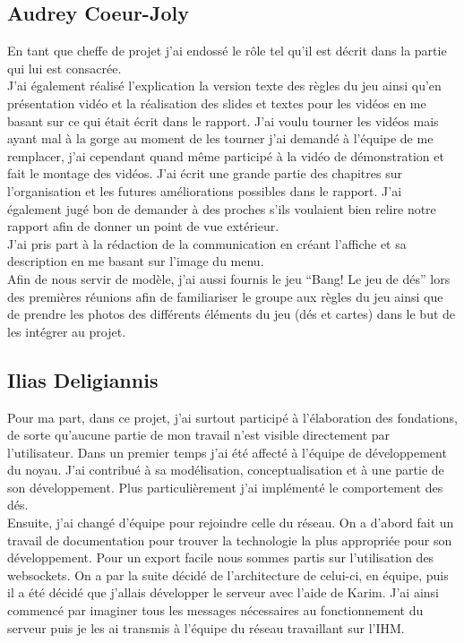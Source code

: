 \documentclass[a4paper,11pt]{article}
\begin{document}
\subsection{Audrey Coeur-Joly}



En tant que cheffe de projet j’ai endossé le rôle tel qu’il est décrit dans la partie qui lui est consacrée.\\ 

	J’ai également réalisé l’explication la version texte des règles du jeu ainsi qu’en présentation vidéo et la réalisation des slides et textes pour les vidéos en me basant sur ce qui était écrit dans le rapport. J’ai voulu tourner les vidéos mais ayant mal à la gorge au moment de les tourner j’ai demandé à l’équipe de me remplacer, j’ai cependant quand même participé à la vidéo de démonstration et fait le montage des vidéos. J’ai écrit une grande partie des chapitres sur l’organisation et les futures améliorations possibles dans le rapport. J’ai également jugé bon de demander à des proches s’ils voulaient bien relire notre rapport afin de donner un point de vue extérieur. \\
	
	J’ai pris part à la rédaction de la communication en créant l’affiche et sa description en me basant sur l’image du menu. \\

	Afin de nous servir de modèle, j’ai aussi fournis le jeu “Bang! Le jeu de dés” lors des premières réunions afin de familiariser le groupe aux règles du jeu ainsi que de prendre les photos des différents éléments du jeu (dés et cartes) dans le but de les intégrer au projet. \\


\subsection{Ilias Deligiannis}

Pour ma part, dans ce projet, j’ai surtout participé à l'élaboration des fondations, de sorte qu'aucune partie de mon travail n’est visible directement par l’utilisateur. Dans un premier temps j’ai été affecté à l’équipe de développement du noyau. J’ai contribué à sa modélisation, conceptualisation et à une partie de son développement. Plus particulièrement j’ai implémenté le comportement des dés.  \\

Ensuite, j’ai changé d’équipe pour rejoindre celle du réseau. On a d’abord fait un travail de documentation pour trouver la technologie la plus appropriée pour son développement. Pour un export facile nous sommes partis sur l’utilisation des websockets. On a par la suite décidé de l'architecture de celui-ci, en équipe, puis il a été décidé que j’allais développer le serveur avec l’aide de Karim. J’ai ainsi commencé par imaginer tous les messages nécessaires au fonctionnement du serveur puis je les ai transmis à l’équipe du réseau travaillant sur l’IHM. \\
\end{document}
